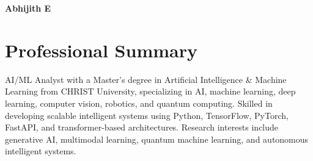 \documentclass[a4paper,10.5pt]{article}
\begin{document}

\begin{center}

{\Huge\bfseries\color{textblack} Abhijith E}

\vspace{4pt}

\small
{}

\end{center}

\vspace{2pt}


\section{Professional Summary}

\small{
AI/ML Analyst with a Master’s degree in Artificial Intelligence \& Machine Learning from CHRIST University, specializing in AI, machine learning, deep learning, computer vision, robotics, and quantum computing. Skilled in developing scalable intelligent systems using Python, TensorFlow, PyTorch, FastAPI, and transformer-based architectures. Research interests include generative AI, multimodal learning, quantum machine learning, and autonomous intelligent systems.
}

\end{document}
